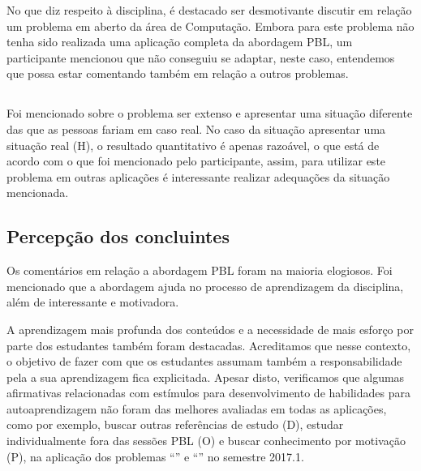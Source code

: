No que diz respeito à disciplina, é destacado ser desmotivante
discutir em relação um problema em aberto da área de Computação.
Embora para este problema não tenha sido realizada uma aplicação
completa da abordagem \ac{PBL}, um participante mencionou que não
conseguiu se adaptar, neste caso, entendemos que possa estar
comentando também em relação a outros problemas.

\subsection{\ProblemaG}

Foi mencionado sobre o problema ser extenso e
apresentar uma situação diferente das que as pessoas fariam em caso
real.
No caso da situação apresentar uma situação real (H), o resultado
quantitativo é apenas razoável, o que está de acordo
com o que foi mencionado pelo participante, assim, para utilizar
este problema em outras aplicações é interessante realizar adequações
da situação mencionada.

\subsection{Percepção dos concluintes}

Os comentários em relação a abordagem \ac{PBL} foram na maioria elogiosos.
Foi mencionado que a abordagem ajuda no processo de aprendizagem da
disciplina, além de interessante e motivadora.

A aprendizagem mais profunda dos conteúdos e a necessidade de mais
esforço por parte dos estudantes também foram destacadas.
Acreditamos que nesse contexto, o objetivo de fazer com que
os estudantes assumam também a responsabilidade pela a
sua aprendizagem fica explicitada.
Apesar disto, verificamos que algumas afirmativas relacionadas
com estímulos para desenvolvimento de habilidades para autoaprendizagem
não foram das melhores avaliadas em todas as aplicações,
como por exemplo, buscar outras referências de estudo (D),
estudar individualmente fora das sessões \ac{PBL} (O) e buscar
conhecimento por motivação (P), na aplicação dos
problemas ``\ProblemaG'' e ``\ProblemaB'' no semestre 2017.1.

